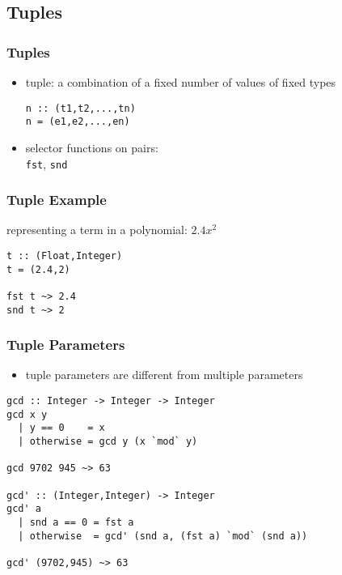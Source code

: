 \documentclass[dvipsnames]{beamer}
\theoremstyle{plain}
\begin{document}
\subsection{Tuples}

\begin{frame}[fragile]
  \frametitle{Tuples}

  \begin{itemize}
    \item \alert{tuple}: a combination of a fixed number of values
      of fixed types
      \smallskip
      \begin{lstlisting}
n :: (t1,t2,...,tn)
n = (e1,e2,...,en)
      \end{lstlisting}

    \medskip
    \item selector functions on pairs:\\
      \lstinline{fst}, \lstinline{snd}
  \end{itemize}
\end{frame}

\begin{frame}[fragile]
  \frametitle{Tuple Example}

  \begin{exampleblock}{representing a term in a polynomial: $2.4x^2$}
    \begin{lstlisting}
t :: (Float,Integer)
t = (2.4,2)

fst t ~> 2.4
snd t ~> 2
    \end{lstlisting}
  \end{exampleblock}
\end{frame}

\begin{frame}[fragile]
  \frametitle{Tuple Parameters}

  \begin{itemize}
    \item tuple parameters are different from multiple parameters
  \end{itemize}

  \begin{exampleblock}{}
    \begin{lstlisting}
gcd :: Integer -> Integer -> Integer
gcd x y
  | y == 0    = x
  | otherwise = gcd y (x `mod` y)

gcd 9702 945 ~> 63

gcd' :: (Integer,Integer) -> Integer
gcd' a
  | snd a == 0 = fst a
  | otherwise  = gcd' (snd a, (fst a) `mod` (snd a))

gcd' (9702,945) ~> 63
    \end{lstlisting}
  \end{exampleblock}
\end{frame}
\end{document}
